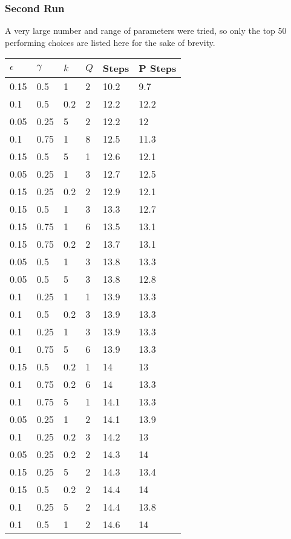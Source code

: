 \documentclass{amsart}
\begin{document}
\subsubsection{Second Run}
A very large number and range of parameters were tried, so only the top 50 performing choices are listed here for the sake of brevity.
\begin{center}
	\begin{longtable}{| l | l | l | l || l | l |} \hline
		$\epsilon$	&$\gamma$	&$k$		&$Q$		&Steps	&P Steps \\ \hline
		0.15&	0.5&	1&	2&	10.2&	9.7 \\ \hline
		0.1&	0.5&	0.2&	2&	12.2&	12.2\\ \hline
		0.05&	0.25&	5&	2&	12.2&	12\\ \hline
		0.1&	0.75&	1&	8&	12.5&	11.3\\ \hline
		0.15&	0.5&	5&	1&	12.6&	12.1\\ \hline
		0.05&	0.25&	1&	3&	12.7&	12.5\\ \hline
		0.15&	0.25&	0.2&	2&	12.9&	12.1\\ \hline
		0.15&	0.5&	1&	3&	13.3&	12.7\\ \hline
		0.15&	0.75&	1&	6&	13.5&	13.1\\ \hline
		0.15&	0.75&	0.2&	2&	13.7&	13.1\\ \hline
		0.05&	0.5&	1&	3&	13.8&	13.3\\ \hline
		0.05&	0.5&	5&	3&	13.8&	12.8\\ \hline
		0.1&	0.25&	1&	1&	13.9&	13.3\\ \hline
		0.1&	0.5&	0.2&	3&	13.9&	13.3\\ \hline
		0.1&	0.25&	1&	3&	13.9&	13.3\\ \hline
		0.1&	0.75&	5&	6&	13.9&	13.3\\ \hline
		0.15&	0.5&	0.2&	1&	14&	13\\ \hline
		0.1&	0.75&	0.2&	6&	14&	13.3\\ \hline
		0.1&	0.75&	5&	1&	14.1&	13.3\\ \hline
		0.05&	0.25&	1&	2&	14.1&	13.9\\ \hline
		0.1&	0.25&	0.2&	3&	14.2&	13\\ \hline
		0.05&	0.25&	0.2&	2&	14.3&	14\\ \hline
		0.15&	0.25&	5&	2&	14.3&	13.4\\ \hline
		0.15&	0.5&	0.2&	2&	14.4&	14\\ \hline
		0.1&	0.25&	5&	2&	14.4&	13.8\\ \hline
		0.1&	0.5&	1&	2&	14.6&	14\\ \hline

\end{longtable}
\end{center}
\end{document}
